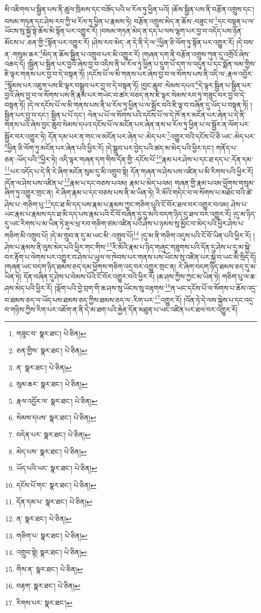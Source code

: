 མི་འཇིགས་པ་སྦྱིན་པས་ནི་ཚུལ་ཁྲིམས་དང་བཟོད་པའི་ཕ་རོལ་ཏུ་ཕྱིན་པའོ། །ཆོས་སྦྱིན་པས་ནི་བརྩོན་འགྲུས་དང་། བསམ་གཏན་དང་ཤེས་རབ་ཀྱི་ཕ་རོལ་ཏུ་ཕྱིན་པ་རྣམས་ཏེ། བརྩོན་འགྲུས་མེད་ན་ཆོས་:བཟུང་བ་\footnote{གཟུང་བ་  སྣར་ཐང་།  པེ་ཅིན། }དང་བསྟན་པ་ལ་ཡོངས་སུ་སྐྱོ་སྟེ་ཆོས་མི་སྟོན་པར་འགྱུར་རོ། །བསམ་གཏན་མེད་ན་དད་པ་ལས་ལྷག་པར་བྱ་བ་འདོད་པས་ཉོན་མོངས་པ་:ཅན་གྱི་\footnote{ཅན་གྱིས་  སྣར་ཐང་།  པེ་ཅིན། }སྟོན་པར་འགྱུར་རོ། །ཤེས་རབ་མེད་:ན་དེ་ནི་དེ་ལ་\footnote{ན་  སྣར་ཐང་།  པེ་ཅིན། }ཕྱིན་ཅི་ལོག་ཏུ་སྟོན་པར་འགྱུར་རོ། །དེ་བས་ན་:གསུམ་ཆར་\footnote{སུམ་ཆར་  སྣར་ཐང་།  པེ་ཅིན། }མེད་ན་ཆོས་སྦྱིན་པ་འགྲུབ་པར་མི་འགྱུར་རོ། །གཞན་དག་ནི་བརྩོན་འགྲུས་ཀུན་དུ་འགྲོའོ་ཞེས་འཆད་དོ། །སྦྱིན་པ་སྦྱིན་པར་བྱའོ་ཞེས་བྱ་བ་འདིས་ནི་ཕ་རོལ་ཏུ་ཕྱིན་པ་དྲུག་པོ་དག་ལ་འདུན་པ་དང་སྨོན་ལམ་གྱིས་ཇི་ལྟར་གནས་པར་བྱ་བ་དེ་བསྟན་ཏོ། །དངོས་པོ་ལ་མི་གནས་པར་ཞེས་བྱ་བ་ལ་སོགས་པས་ནི་འདི་ལ་:རྣལ་འབྱོར་\footnote{རྣལ་འབྱོར་ལ་  སྣར་ཐང་།  པེ་ཅིན། }སྙོམས་པར་འཇུག་པས་ཇི་ལྟར་བསྒྲུབ་པར་བྱ་བ་དེ་བསྟན་ཏོ། །བྱང་ཆུབ་:སེམས་དཔའ་\footnote{སེམས་དཔས་  སྣར་ཐང་།  པེ་ཅིན། }དེ་ལྟར་སྦྱིན་པ་སྦྱིན་པར་བྱའོ་ཞེས་བྱ་བ་ལ་སོགས་པས་ནི་རྣམ་པར་གཡེང་བ་ཚར་བཅད་ནས་ཇི་ལྟར་སེམས་རབ་ཏུ་གཟུང་བར་བྱ་བ་དེ་བསྟན་ཏོ། །དེ་ལ་དངོས་པོ་ལ་མི་གནས་པས་ནི་ཕ་རོལ་ཏུ་ཕྱིན་པ་ལ་སྦྱོར་བའི་ཇི་ལྟ་བ་བཞིན་དུ་ཡོད་པ་བསྟན་ཏོ། །སྦྱིན་པར་བྱ་བ་དང་། སྦྱིན་པ་པོ་དང་། ལེན་པ་པོ་ལ་སོགས་པའི་དངོས་པོ་ལ་དེ་ཁོ་ནར་མངོན་པར་ཞེན་པ་དེ་ནི་གནས་པའོ་ཞེས་བྱང་ཆུབ་སེམས་དཔའ་དངོས་པོ་ལ་མངོན་པར་ཞེན་ནས་ཕ་རོལ་ཏུ་ཕྱིན་པ་ལ་སྦྱོར་ན་ལོག་པར་སྦྱོར་བར་འགྱུར་ཏེ། དོན་དམ་པར་ན་གང་ལ་མངོན་པར་ཞེན་པ་:མེད་པར་\footnote{བདེན་པར་  སྣར་ཐང་།  པེ་ཅིན། }འགྱུར་བའི་དངོས་པོ་ཅི་ཡང་:མེད་པར་\footnote{མེད་པས་  སྣར་ཐང་།  པེ་ཅིན། }ཕྱིན་ཅི་ལོག་ཏུ་མངོན་པར་ཞེན་པའི་ཕྱིར་རོ། །དེ་སྒྲུབ་པར་བྱེད་པའི་ཚད་མ་མེད་པའི་ཕྱིར་དང་། གནོད་པ་ཅན་:ཡོད་པའི་\footnote{ཡོད་པའི་ཡང་  སྣར་ཐང་།  པེ་ཅིན། }ཕྱིར་ཏེ། འདི་ལྟར་གཞན་དག་གིས་དོན་གྱི་:དངོས་པོ་\footnote{དངོས་པོ་གང་  སྣར་ཐང་།  པེ་ཅིན། }རྣམ་པར་ཤེས་པ་དང་ཐ་དད་པ་:དོན་དམ་\footnote{དོན་དམ་པ་  སྣར་ཐང་།  པེ་ཅིན། }པར་འདོད་པ་དེ་ནི་རེ་ཞིག་མངོན་སུམ་དུ་མི་འགྲུབ་སྟེ། དོན་གཞན་ལ་ཤེས་པས་འཛིན་པ་མི་རིགས་པའི་ཕྱིར་རོ། །དོན་ལ་ཤེས་པས་འཛིན་པ་\footnote{ན་  སྣར་ཐང་།  པེ་ཅིན། }རྣམ་པ་དང་བཅས་པའམ། རྣམ་པ་མེད་པའམ། གཞན་གྱི་རྣམ་པའམ་ཕྱོགས་གསུམ་ཞིག་ཏུ་འགྱུར་གྲང་ན། རེ་ཞིག་རྣམ་པ་དང་བཅས་པས་ནི་མ་ཡིན་ཏེ། རི་མོའི་གདེང་བ་ལ་སོགས་པ་མཐོང་བའི་ཚེ་ཤེས་པ་:གཅིག་པུ་\footnote{གཅིག་པ་  སྣར་ཐང་།  པེ་ཅིན། }དང་ཐ་མི་དད་པས་རྣམ་པ་རྣམས་ཀྱང་གཅིག་པུའི་ངོ་བོར་ཐལ་བར་འགྱུར་བའམ། ཤེས་པ་ཡང་རྣམ་པ་རྣམས་དང་ཐ་མི་དད་པས་རྣམ་པའི་ངོ་བོ་བཞིན་དུ་དུ་མའི་བདག་ཉིད་དུ་ཐལ་བར་འགྱུར་རོ། །དུ་མ་ཉིད་དུ་ཡང་རིགས་པ་མ་ཡིན་ཏེ་རྡུལ་ཕྲ་རབ་གཅིག་ཙམ་འཛིན་པའི་ཤེས་པ་ཉམས་སུ་མྱོང་བ་མེད་པའི་ཕྱིར་ཤེས་པ་གཅིག་མི་འགྲུབ་པོ། །དེ་མ་གྲུབ་ན་དུ་མ་ཡང་མི་:འགྲུབ་པོ།\footnote{འགྲུབ་སྟེ།  སྣར་ཐང་།  པེ་ཅིན། } །དུ་མ་ནི་གཅིག་འདུས་པའི་ངོ་བོ་ཡིན་པའི་ཕྱིར་རོ། །ཤེས་པ་རྣམས་ནི་ལུས་མེད་པའི་ཕྱིར་གང་གིས་\footnote{གིས་ན་  སྣར་ཐང་།  པེ་ཅིན། }རི་མོའི་རྣམ་པ་ཉིད་གཞུང་གཟུགས་པའི་དོན་དུ་ཤེས་པ་དུ་མ་སྐྱེ་བར་རྟོག་པ་ལེགས་པར་འགྱུར་བ་ཤེས་པ་ཡུལ་ལ་ཁེབས་པར་གནས་པས་ཡོངས་སུ་འཛིན་པར་སྐྱེ་བ་ཡང་མི་སྲིད་དོ། །གཞན་ཡང་བདག་ཉིད་ཐམས་ཅད་དམ་ཕྱོགས་གཅིག་འདྲ་བར་འགྱུར་གྲང་ན། རེ་ཞིག་བདག་ཉིད་ཐམས་ཅད་དུ་མ་ཡིན་ཏེ། དོན་བཞིན་དུ་ཤེས་པ་བེམས་པོའི་ངོ་བོར་འགྱུར་བའི་ཕྱིར་རོ། །ཆ་ཤས་ཀྱིས་ཀྱང་མ་ཡིན་ཏེ། གཅིག་པུ་ལ་ཆ་ཤས་མེད་པའི་ཕྱིར་རོ། །ལྡོག་པའི་བྱེ་བྲག་གི་ཆ་ཤས་སུ་ཡོངས་སུ་བརྟགས་\footnote{བརྟག་  སྣར་ཐང་།  པེ་ཅིན། }ན་ཡང་དངོས་པོ་ལ་སོགས་པ་ཆོས་འདྲ་བ་ཐམས་ཅད་ལ་ཡོད་པས་ཐམས་ཅད་ཀྱིས་ཐམས་ཅད་ལ་:རིག་པར་\footnote{རིགས་པར་  སྣར་ཐང་། }འགྱུར་རོ། །འོན་ཏེ་དེ་ལས་སྐྱེས་པ་དང་འདྲ་བ་གཉིས་ཀྱིས་རིག་པར་འཇོག་ན་ནི་དེ་མ་ཐག་པའི་རྐྱེན་དོན་མཐུན་པ་ཡང་འཛིན་པར་ཐལ་བར་འགྱུར་རོ། 